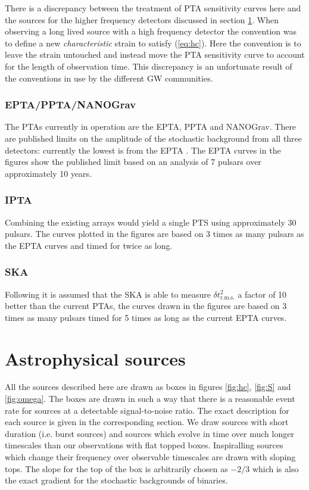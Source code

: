 \documentclass[fleqn,12pt]{iopart}
\begin{document}
There is a discrepancy between the treatment of PTA sensitivity curves here and the sources for the higher frequency detectors discussed in section \ref{sec:sources}. When observing a long lived source with a high frequency detector the convention was to define a new \emph{characteristic} strain to satisfy (\ref{eq:hc}). Here the convention is to leave the strain untouched and instead move the PTA sensitivity curve to account for the length of observation time. This discrepancy is an unfortunate result of the conventions in use by the different GW communities.


\subsubsection{EPTA/PPTA/NANOGrav}
The PTAs currently in operation are the EPTA, PPTA and NANOGrav. There are published limits on the amplitude of the stochastic background from all three detectors: currently the lowest is from the EPTA \citep{VanHaasteren2011}. The EPTA curves in the figures show the  published limit based on an analysis of 7 pulsars over approximately 10 years.

\subsubsection{IPTA}
Combining the existing arrays would yield a single PTS using approximately 30 pulsars. The curves plotted in the figures are based on 3 times as many pulsars as the EPTA curves and timed for twice as long.

\subsubsection{SKA}
Following \citet{Sesana2008} it is assumed that the SKA is able to measure $\delta t^{2}_{\textrm{r.m.s.}}$ a factor of 10 better than the current PTAs, the curves drawn in the figures are based on 3 times as many pulsars timed for 5 times as long as the current EPTA curves.

\section{Astrophysical sources}\label{sec:sources}

All the sources described here are drawn as boxes in figures \ref{fig:hc}, \ref{fig:S} and \ref{fig:omega}. The boxes are drawn in such a way that there is a reasonable event rate for sources at a detectable signal-to-noise ratio. The exact description for each source is given in the corresponding section. We draw sources with short duration (i.e. burst sources) and sources which evolve in time over much longer timescales than our observations with flat topped boxes. Inspiralling sources which change their frequency over observable timescales are drawn with sloping tops. The slope for the top of the box is arbitrarily chosen as $-2/3$ which is also the exact gradient for the stochastic backgrounds of binaries. 
\end{document}
